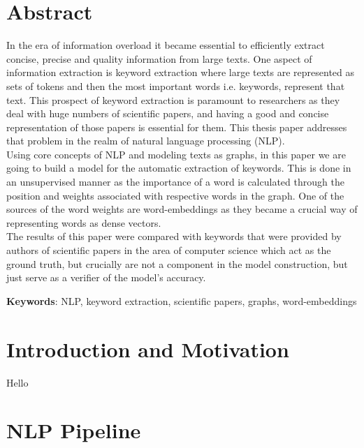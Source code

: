 \documentclass[12pt]{article}
\numberwithin{equation}{section}
\begin{document}
	\begin{spacing}{1.5}
	\section*{Abstract}
	In the era of information overload it became essential to efficiently extract concise, precise and quality information from large texts. One aspect of information extraction is keyword extraction where large texts are represented as sets of tokens and then the most important words i.e. keywords, represent that text. This prospect of keyword extraction is paramount to researchers as they deal with huge numbers of scientific papers, and having a good and concise representation of those papers is essential for them. This thesis paper addresses that problem in the realm of natural language processing (NLP). \\
	Using core concepts of NLP and modeling texts as graphs, in this paper we are going to build a model for the automatic extraction of keywords. This is done in an unsupervised manner as the importance of a word is calculated through the position and weights associated with respective words in the graph. One of the sources of the word weights are word-embeddings as they became a crucial way of representing words as dense vectors. \\
	The results of this paper were compared with keywords that were provided by authors of scientific papers in the area of computer science which act as the ground truth, but crucially are not a component in the model construction, but just serve as a verifier of the model's accuracy.
	
	\textbf{Keywords}: NLP, keyword extraction, scientific papers, graphs, word-embeddings
	
	\newpage
	\pagestyle{empty}
	\tableofcontents
	\setcounter{page}{0}
	\newpage
	\listoffigures
	\setcounter{page}{0}
	\pagebreak
	
	
	\newpage
	\pagestyle{fancy}
	\section{Introduction and Motivation}
	Hello
	\section{NLP Pipeline}
	

\end{spacing}
\end{document}
